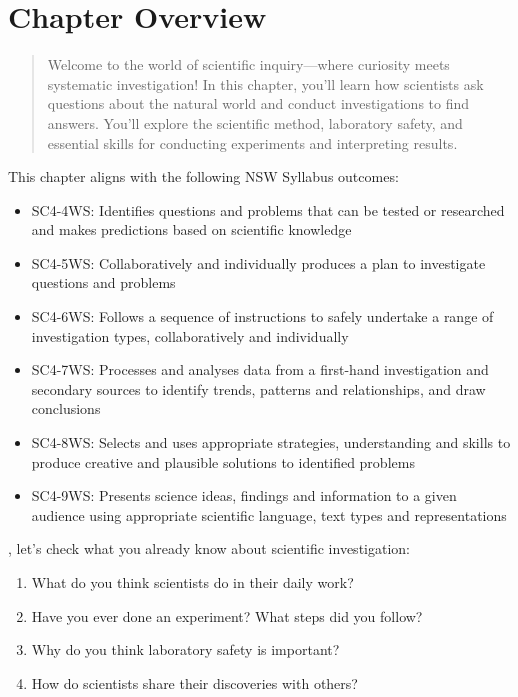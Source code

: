 \documentclass[justified,notoc]{tufte-book}
\newenvironment{stopandthink}{%
    \begin{tcolorbox}[colback=highlight!30,colframe=highlight!50,title=\textbf{Stop and Think}]
}{%
    \end{tcolorbox}
}
\begin{document}
\section*{Chapter Overview}

\begin{quote}
    Welcome to the world of scientific inquiry—where curiosity meets systematic investigation! In this chapter, you'll learn how scientists ask questions about the natural world and conduct investigations to find answers. You'll explore the scientific method, laboratory safety, and essential skills for conducting experiments and interpreting results.
\end{quote}

\noindent This chapter aligns with the following NSW Syllabus outcomes:
\begin{itemize}
    \item SC4-4WS: Identifies questions and problems that can be tested or researched and makes predictions based on scientific knowledge
    \item SC4-5WS: Collaboratively and individually produces a plan to investigate questions and problems
    \item SC4-6WS: Follows a sequence of instructions to safely undertake a range of investigation types, collaboratively and individually
    \item SC4-7WS: Processes and analyses data from a first-hand investigation and secondary sources to identify trends, patterns and relationships, and draw conclusions
    \item SC4-8WS: Selects and uses appropriate strategies, understanding and skills to produce creative and plausible solutions to identified problems
    \item SC4-9WS: Presents science ideas, findings and information to a given audience using appropriate scientific language, text types and representations
\end{itemize}

, let's check what you already know about scientific investigation:

\begin{stopandthink}
\begin{enumerate}
    \item What do you think scientists do in their daily work?
    \item Have you ever done an experiment? What steps did you follow?
    \item Why do you think laboratory safety is important?
    \item How do scientists share their discoveries with others?
\end{enumerate}
\end{stopandthink}
\end{document}
